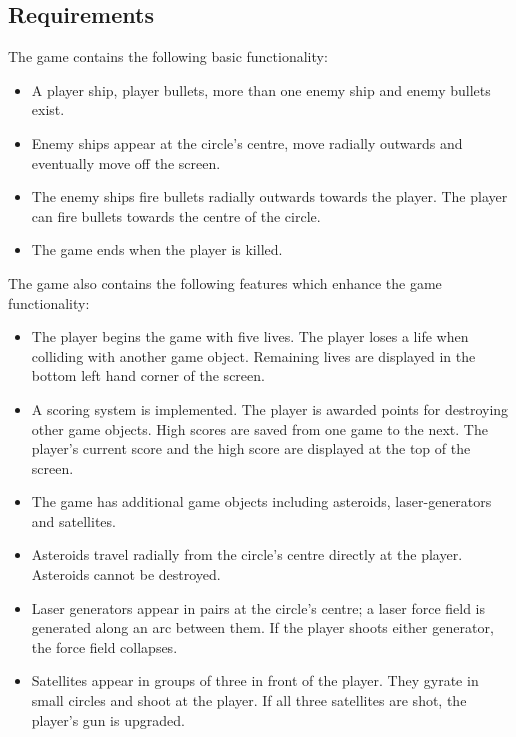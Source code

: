 \documentclass[10pt,twocolumn]{witseiepaper}
\begin{document}
\subsection{Requirements}\label{functionlity_requirements}

The game contains the following basic functionality:

\begin{itemize}
	\item A player ship, player bullets, more than one enemy ship and enemy bullets exist.
	\item Enemy ships appear at the circle's centre, move radially outwards and eventually move off the screen. 
	\item The enemy ships fire bullets radially outwards towards the player. The player can fire bullets towards the centre of the circle.
	\item The game ends when the player is killed.
\end{itemize}

The game also contains the following features which enhance the game functionality:

\begin{itemize}
	\item The player begins the game with five lives. The player loses a life when colliding with another game object. Remaining lives are displayed in the bottom left hand corner of the screen.
	\item A scoring system is implemented. The player is awarded points for destroying other game objects. High scores are saved from one game to the next. The player's current score and the high score are displayed at the top of the screen.
	\item The game has additional game objects including asteroids, laser-generators and satellites.
	\item Asteroids travel radially from the circle's centre directly at the player. Asteroids cannot be destroyed.
	\item Laser generators appear in pairs at the circle's centre; a laser force field is generated along an arc between them. If the player shoots either generator, the force field collapses.
	\item Satellites appear in groups of three in front of the player. They gyrate in small circles and shoot at the player. If all three satellites are shot, the player's gun is upgraded.
	
\end{itemize}
\end{document}
